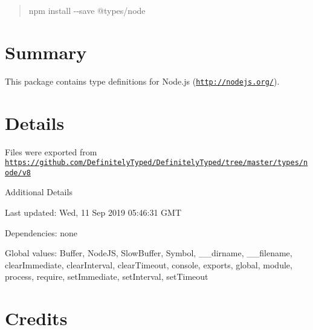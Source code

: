 \begin{quote}
{\ttfamily npm install -\/-\/save @types/node} \end{quote}


\section*{Summary}

This package contains type definitions for Node.\+js (\href{http://nodejs.org/}{\tt http\+://nodejs.\+org/}).

\section*{Details}

Files were exported from \href{https://github.com/DefinitelyTyped/DefinitelyTyped/tree/master/types/node/v8}{\tt https\+://github.\+com/\+Definitely\+Typed/\+Definitely\+Typed/tree/master/types/node/v8}

Additional Details
\begin{DoxyItemize}
\item Last updated\+: Wed, 11 Sep 2019 05\+:46\+:31 G\+MT
\item Dependencies\+: none
\item Global values\+: Buffer, Node\+JS, Slow\+Buffer, Symbol, \+\_\+\+\_\+dirname, \+\_\+\+\_\+filename, clear\+Immediate, clear\+Interval, clear\+Timeout, console, exports, global, module, process, require, set\+Immediate, set\+Interval, set\+Timeout
\end{DoxyItemize}

\section*{Credits}

